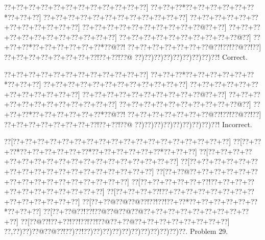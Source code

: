 \documentclass[a5paper]{article}
\begin{document}
\begin{center}
{\goo
\0??+\0??+\0??+\0??+\0??+\0??+\0??+\0??+\0??+\0??+\0??+\0??]
\0??+\0??+\0??*\0??+\0??+\0??+\0??+\0??+\0??*\0??+\0??+\0??]
\0??+\0??+\0??+\0??+\0??+\0??+\0??+\0??+\0??+\0??+\0??+\0??]
\0??+\0??+\0??+\0??+\0??+\0??+\0??+\0??+\0??+\0??+\0??+\0??]
\0??+\0??+\0??+\0??+\0??+\0??+\0??+\0??+\0??+\0??@\0??+\0??]
\0??+\0??+\0??+\0??+\0??+\0??+\0??+\0??+\0??+\0??+\0??+\0??]
\0??+\0??+\0??+\0??+\0??+\0??+\0??+\0??+\0??+\0??@\0??]
\0??+\0??+\0??*\0??+\0??+\0??+\0??+\0??+\0??*\0??@\0??!
\0??+\0??+\0??+\0??+\0??+\0??+\0??@\0??!\0??!\0??@\0??!\0??]
\0??+\0??+\0??+\0??+\0??+\0??+\0??+\0??!\0??+\0??!\0??@
\0??)\0??)\0??)\0??)\0??)\0??)\0??)\0??)\0??!
}
Correct. 

\end{center}
\begin{center}
{\goo
\0??+\0??+\0??+\0??+\0??+\0??+\0??+\0??+\0??+\0??+\0??+\0??]
\0??+\0??+\0??*\0??+\0??+\0??+\0??+\0??+\0??*\0??+\0??+\0??]
\0??+\0??+\0??+\0??+\0??+\0??+\0??+\0??+\0??+\0??+\0??+\0??]
\0??+\0??+\0??+\0??+\0??+\0??+\0??+\0??+\0??+\0??+\0??+\0??]
\0??+\0??+\0??+\0??+\0??+\0??+\0??+\0??+\0??+\0??@\0??+\0??]
\0??+\0??+\0??+\0??+\0??+\0??+\0??+\0??+\0??+\0??+\0??+\0??]
\0??+\0??+\0??+\0??+\0??+\0??+\0??+\0??+\0??+\0??@\0??]
\0??+\0??+\0??*\0??+\0??+\0??+\0??+\0??+\0??*\0??@\0??!
\0??+\0??+\0??+\0??+\0??+\0??+\0??@\0??!\0??!\0??@\0??!\0??]
\0??+\0??+\0??+\0??+\0??+\0??+\0??+\0??!\0??+\0??!\0??@
\0??)\0??)\0??)\0??)\0??)\0??)\0??)\0??)\0??!
}
Incorrect. 

\end{center}
\newpage
\begin{center}
{\goo
\0??[\0??+\0??+\0??+\0??+\0??+\0??+\0??+\0??+\0??+\0??+\0??+\0??+\0??+\0??+\0??+\0??+\0??+\0??]
\0??[\0??+\0??+\0??*\0??+\0??+\0??+\0??+\0??+\0??*\0??+\0??+\0??+\0??+\0??+\0??*\0??+\0??+\0??]
\0??[\0??+\0??+\0??+\0??+\0??+\0??+\0??+\0??+\0??+\0??+\0??+\0??+\0??+\0??+\0??+\0??+\0??+\0??]
\0??[\0??+\0??+\0??+\0??+\0??+\0??+\0??+\0??+\0??+\0??+\0??+\0??+\0??+\0??+\0??+\0??+\0??+\0??]
\0??[\0??+\0??@\0??+\0??+\0??+\0??+\0??+\0??+\0??+\0??+\0??+\0??+\0??+\0??+\0??+\0??+\0??+\0??]
\0??[\0??+\0??+\0??+\0??+\0??+\0??!\0??+\0??+\0??+\0??+\0??+\0??+\0??+\0??+\0??+\0??+\0??+\0??]
\0??[\0??+\0??+\0??+\0??!\0??+\0??+\0??+\0??+\0??+\0??+\0??+\0??+\0??+\0??+\0??+\0??+\0??+\0??]
\0??[\0??+\0??@\0??@\0??@\0??!\0??!\0??!\0??+\0??*\0??+\0??+\0??+\0??+\0??+\0??*\0??+\0??+\0??]
\0??[\0??+\0??@\0??!\0??!\0??@\0??@\0??@\0??@\0??+\0??+\0??+\0??+\0??+\0??+\0??+\0??+\0??+\0??]
\0??[\0??@\0??!\0??+\0??!\0??!\0??!\0??!\0??@\0??+\0??@\0??+\0??+\0??+\0??+\0??+\0??+\0??+\0??]
\0??,\0??)\0??)\0??@\0??@\0??!\0??)\0??!\0??)\0??)\0??)\0??)\0??)\0??)\0??)\0??)\0??)\0??)\0??.
}
Problem 29.

\end{center}
\end{document}
